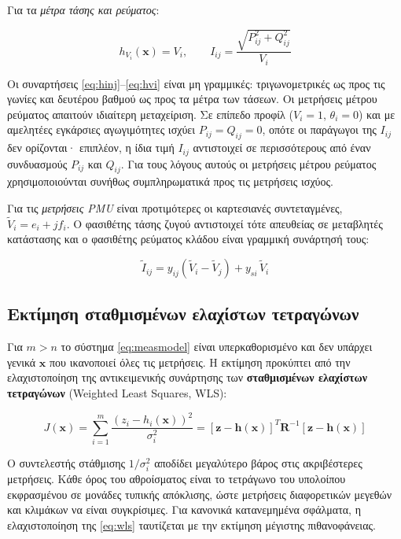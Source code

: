 Για τα \emph{μέτρα τάσης και ρεύματος}:

\begin{equation}
h_{V_i}(\mathbf{x}) = V_i, \qquad
I_{ij} = \frac{\sqrt{P_{ij}^2 + Q_{ij}^2}}{V_i}
\label{eq:hvi}
\end{equation}

Οι συναρτήσεις \eqref{eq:hinj}--\eqref{eq:hvi} είναι μη γραμμικές: τριγωνομετρικές ως προς τις
γωνίες και δευτέρου βαθμού ως προς τα μέτρα των τάσεων. Οι μετρήσεις μέτρου ρεύματος απαιτούν
ιδιαίτερη μεταχείριση. Σε επίπεδο προφίλ ($V_i = 1$, $\theta_i = 0$) και με αμελητέες
εγκάρσιες αγωγιμότητες ισχύει $P_{ij} = Q_{ij} = 0$, οπότε οι παράγωγοι της $I_{ij}$ δεν
ορίζονται· επιπλέον, η ίδια τιμή $I_{ij}$ αντιστοιχεί σε περισσότερους από έναν συνδυασμούς
$P_{ij}$ και $Q_{ij}$. Για τους λόγους αυτούς οι μετρήσεις μέτρου ρεύματος χρησιμοποιούνται
συνήθως συμπληρωματικά προς τις μετρήσεις ισχύος.

Για τις \emph{μετρήσεις PMU} είναι προτιμότερες οι καρτεσιανές συντεταγμένες,
$\tilde{V}_i = e_i + j f_i$. Ο φασιθέτης τάσης ζυγού αντιστοιχεί τότε απευθείας σε μεταβλητές
κατάστασης και ο φασιθέτης ρεύματος κλάδου είναι γραμμική συνάρτησή τους:

\begin{equation}
\tilde{I}_{ij} = y_{ij}\left(\tilde{V}_i - \tilde{V}_j\right) + y_{si}\,\tilde{V}_i
\label{eq:hpmu}
\end{equation}

\subsection{Εκτίμηση σταθμισμένων ελαχίστων τετραγώνων}
\label{sec:wls}

Για $m > n$ το σύστημα \eqref{eq:measmodel} είναι υπερκαθορισμένο και δεν υπάρχει γενικά
$\mathbf{x}$ που ικανοποιεί όλες τις μετρήσεις. Η εκτίμηση προκύπτει από την ελαχιστοποίηση της
αντικειμενικής συνάρτησης των \textbf{σταθμισμένων ελαχίστων τετραγώνων} (Weighted Least
Squares, WLS):

\begin{equation}
J(\mathbf{x}) = \sum_{i=1}^{m} \frac{\left(z_i - h_i(\mathbf{x})\right)^2}{\sigma_i^2}
             = \left[\mathbf{z}-\mathbf{h}(\mathbf{x})\right]^{T} \mathbf{R}^{-1}
               \left[\mathbf{z}-\mathbf{h}(\mathbf{x})\right]
\label{eq:wls}
\end{equation}

Ο συντελεστής στάθμισης $1/\sigma_i^2$ αποδίδει μεγαλύτερο βάρος στις ακριβέστερες μετρήσεις.
Κάθε όρος του αθροίσματος είναι το τετράγωνο του υπολοίπου εκφρασμένου σε μονάδες τυπικής
απόκλισης, ώστε μετρήσεις διαφορετικών μεγεθών και κλιμάκων να είναι συγκρίσιμες. Για
κανονικά κατανεμημένα σφάλματα, η ελαχιστοποίηση της \eqref{eq:wls} ταυτίζεται με την
εκτίμηση μέγιστης πιθανοφάνειας.

